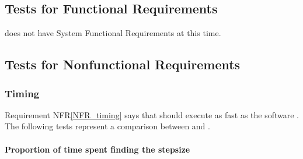 \documentclass[12pt, titlepage]{article}
\newcommand{\nfrref}[1]{NFR\ref{#1}}
\begin{document}
\subsection{Tests for Functional Requirements}

 does not have System Functional Requirements at this time.

\subsection{Tests for Nonfunctional Requirements}

\subsubsection{Timing}

Requirement \nfrref{NFR_timing} says that  should execute as fast as
the \cite{chang1982} software \rdcon. The following tests represent a comparison between
 and \rdcon.

\paragraph{Proportion of time spent finding the stepsize}
\end{document}
